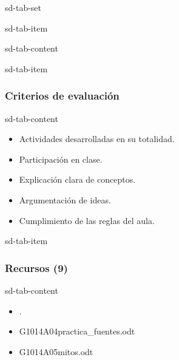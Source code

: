 \documentclass[letterpaper,10pt,spanish]{sphinxmanual}
\begin{document}
\begin{sphinxuseclass}{sd-tab-set}
\begin{sphinxuseclass}{sd-tab-item}
\begin{sphinxuseclass}{sd-tab-content}
\begin{itemize}
\end{itemize}

\end{sphinxuseclass}
\end{sphinxuseclass}
\begin{sphinxuseclass}{sd-tab-item}\subsubsection*{Criterios de evaluación}

\begin{sphinxuseclass}{sd-tab-content}\begin{itemize}
\item {} 
\sphinxAtStartPar
Actividades desarrolladas en su totalidad.

\item {} 
\sphinxAtStartPar
Participación en clase.

\item {} 
\sphinxAtStartPar
Explicación clara de conceptos.

\item {} 
\sphinxAtStartPar
Argumentación de ideas.

\item {} 
\sphinxAtStartPar
Cumplimiento de las reglas del aula.

\end{itemize}

\end{sphinxuseclass}
\end{sphinxuseclass}
\begin{sphinxuseclass}{sd-tab-item}\subsubsection*{Recursos (9)}

\begin{sphinxuseclass}{sd-tab-content}\begin{itemize}
\item {} 
\sphinxAtStartPar
{}.

\item {} 
\sphinxAtStartPar
G1014A04\sphinxhyphen{}practica\_fuentes.odt 

\item {} 
\sphinxAtStartPar
G1014A05\sphinxhyphen{}mitos.odt 


\end{itemize}
\end{sphinxuseclass}
\end{sphinxuseclass}
\end{sphinxuseclass}
\end{document}
